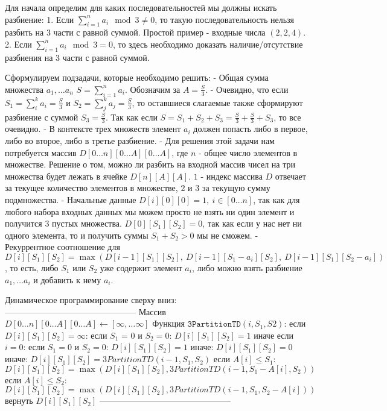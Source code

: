 Для начала определим для каких последовательностей мы должны искать разбиение:
1. Если $\sum_{i=1}^n a_i \mod 3 \neq 0$, то такую последовательность нельзя разбить на $3$ части с равной суммой. Простой пример - входные числа $(2, 2, 4)$.
2. Если $\sum_{i=1}^n a_i \mod 3 = 0$, то здесь необходимо доказать наличие/отсутствие разбиения на $3$ части с равной суммой.

Сформулируем подзадачи, которые необходимо решить:
- Общая сумма множества ${a_1, \ldots a_n}$ $S=\sum_{i=1}^n a_i$. Обозначим за $\displaystyle{A = \frac{S}{3}}$.
- Очевидно, что если $\displaystyle{S_1 = \sum_{i}^k a_i = \frac{S}{3}}$ и $\displaystyle{S_2 = \sum_{j}^k a_j = \frac{S}{3}}$, то оставшиеся слагаемые также сформируют разбиение с суммой $\displaystyle{S_3 = \frac{S}{3}}$. Так как если $\displaystyle{S = S_1 + S_2 + S_3 = \frac{S}{3} + \frac{S}{3} + S_3}$, то все очевидно.
- В контексте трех множеств элемент $a_i$ должен попасть либо в первое, либо во второе, либо в третье разбиение. 
- Для решения этой задачи нам потребуется массив $D[0 \ldots n][0 \ldots A][0 \ldots A]$, где $n$ - общее число элементов в множестве. Решение о том, можно ли разбить на входной массив чисел на три множества будет лежать в ячейке $D[n][A][A]$. $1$ - индекс массива $D$ отвечает за текущее количество элементов в множестве, $2$ и $3$ за текущую сумму подмножества.
- Начальные данные $D[i][0][0] = 1,\: i \in [0 \ldots n]$, так как для любого набора входных данных мы можем просто не взять ни один элемент и получится $3$ пустых множества.
$D[0][S_1][S_2] = 0$, так как если у нас нет ни одного элемента, то и получить суммы $S_1 + S_2 > 0$ мы не сможем.
- Рекуррентное соотношение для $D[i][S_1][S_2] = \max\left(D[i - 1][S_1][S_2], \: D[i - 1][S_1 - a_i][S_2], \: D[i - 1][S_1][S_2 - a_i]\right)$, то есть, либо $S_1$ или $S_2$ уже содержит элемент $a_i$, либо можно взять разбиение $a_1, \ldots a_i$ и добавить к нему $a_i$.

Динамическое программирование сверху вниз:
-----------------------------------------------
Массив $D[0 \ldots n][0 \ldots A][0 \ldots A] \leftarrow [\infty, \ldots \infty]$
Функция $\texttt{3PartitionTD}(i, S_1, S2)$:
если $D[i][S_1][S_2] = \infty$:
    если $S_1$ = 0 и $S_2 = 0$:
        $D[i][S_1][S_2] = 1$
    иначе если $i = 0$:
        если $S_1 = 0$ и $S_2 = 0$:
            $D[i][S_1][S_2] = 1$
        иначе:
            $D[i][S_1][S_2] = 0$
    иначе:
        $D[i][S_1][S_2] = 3PartitionTD(i - 1, S_1, S_2)$
        если $A[i] \leq S_1$:
            $D[i][S_1][S_2] = \max\left(D[i][S_1][S_2], 3PartitionTD(i - 1, S_1 - A[i], S_2)\right)$
        если $A[i] \leq S_2$:
            $D[i][S_1][S_2] = \max\left(D[i][S_1][S_2], 3PartitionTD(i - 1, S_1, S_2 - A[i])\right)$
вернуть $D[i][S_1][S_2]$
-----------------------------------------------

